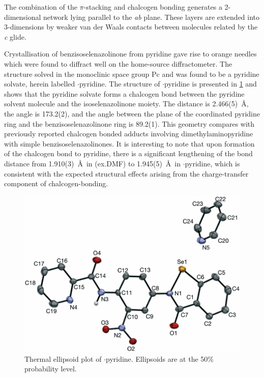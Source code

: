 \begin{refsection}
    The combination of the $\pi$-stacking and chalcogen bonding generates a 2-dimension\-al network lying parallel to the \emph{ab} plane.
    These layers are extended into 3-dimensions by weaker van der Waals contacts between molecules related by the \emph{c} glide.
    
    Crystallisation of benzisoselenazolinone  from pyridine gave rise to orange needles which were found to diffract well on the home-source diffractometer.
    The structure solved in the monoclinic space group Pc and was found to be a pyridine solvate, herein labelled $\cdot$pyridine.
    The structure of $\cdot$pyridine is presented in \cref{fig:ebs-nitroamide-2py-py-xtal} and shows that the pyridine solvate forms a  chalcogen bond between the pyridine solvent molecule and the isoselenazolinone moiety.
    The  distance is 2.466(5)~\AA, the  angle is 173.2(2)\degree, and the angle between the plane of the coordinated pyridine ring and the benzisoselenazolinone ring is 89.2(1)\degree.
    This geometry compares with previously reported chalcogen bonded adducts involving dimethylaminopyridine with simple benzisoselenazolinones.\autocite{Fellowes2019}
    It is interesting to note that upon formation of the chalcogen bond to pyridine, there is a significant lengthening of the  bond distance from 1.910(3)~\AA~in (ex.DMF) to 1.945(5)~\AA~in $\cdot$pyridine, which is consistent with the expected structural effects arising from the charge-transfer component of chalcogen-bonding.\autocite{Fellowes2019,Pascoe2017}
    
    \begin{figure}
        \centering
        \includegraphics[width=0.8\linewidth]{Figures/ebs-nitroamide-2py-py-xtal.pdf}
        \caption[Thermal ellipsoid plot of $\cdot$pyridine.]{Thermal ellipsoid plot of $\cdot$pyridine. Ellipsoids are at the 50\% probability level.}\label{fig:ebs-nitroamide-2py-py-xtal}
    \end{figure}
    

\end{refsection}
